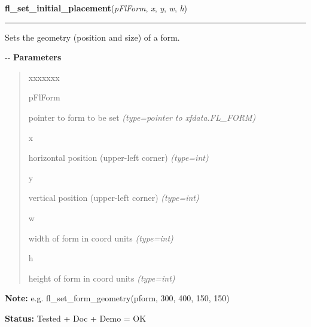     \vspace{0.5ex}

\hspace{.8\funcindent}\begin{boxedminipage}{\funcwidth}

    \raggedright \textbf{fl\_set\_initial\_placement}(\textit{pFlForm}, \textit{x}, \textit{y}, \textit{w}, \textit{h})

    \vspace{-1.5ex}

    \rule{\textwidth}{0.5\fboxrule}
\setlength{\parskip}{2ex}

Sets the geometry (position and size) of a form.

-{}-
\setlength{\parskip}{1ex}
      \textbf{Parameters}
      \vspace{-1ex}

      \begin{quote}
        \begin{Ventry}{xxxxxxx}

          \item[pFlForm]


pointer to form to be set
            {\it (type=pointer to xfdata.FL\_FORM)}

          \item[x]


horizontal position (upper-left corner)
            {\it (type=int)}

          \item[y]


vertical position (upper-left corner)
            {\it (type=int)}

          \item[w]


width of form in coord units
            {\it (type=int)}

          \item[h]


height of form in coord units
            {\it (type=int)}

        \end{Ventry}

      \end{quote}

\textbf{Note:} 
e.g. fl\_set\_form\_geometry(pform, 300, 400, 150, 150)


\textbf{Status:} 
Tested + Doc + Demo = OK


    \end{boxedminipage}

